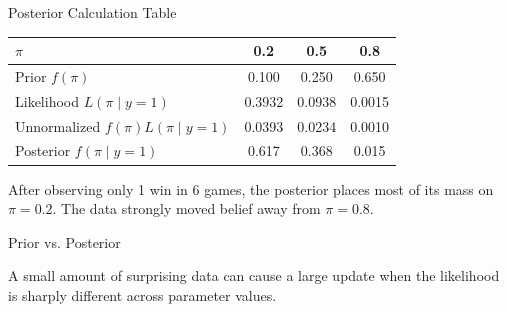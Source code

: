 \documentclass[12pt]{beamer}
\begin{document}
\begin{frame}{}
\begin{block}{Posterior Calculation Table}
\begin{center}
\begin{tabular}{lccc}
\toprule
$\pi$ & 0.2 & 0.5 & 0.8 \\
\midrule
Prior $f(\pi)$ & 0.100 & 0.250 & 0.650 \\
Likelihood $L(\pi\mid y=1)$ & 0.3932 & 0.0938 & 0.0015 \\
Unnormalized $f(\pi)L(\pi\mid y=1)$ & 0.0393 & 0.0234 & 0.0010 \\
Posterior $f(\pi\mid y=1)$ & \alert{0.617} & 0.368 & 0.015 \\
\bottomrule
\end{tabular}
\end{center}

\vspace{0.2cm}
After observing only 1 win in 6 games, the posterior places most of its mass on $\pi=0.2$.
The data strongly moved belief away from $\pi=0.8$.
\end{block}
\end{frame}

\begin{frame}{}
\begin{block}{Prior vs. Posterior}
\small

\begin{center}
\end{center}

\vspace{-0.2cm}
\centering
A small amount of surprising data can cause a large update when the likelihood is sharply different across parameter values.

\end{block}
\end{frame}
\end{document}
